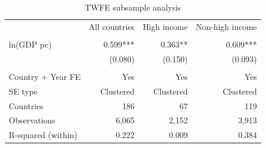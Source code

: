 \begin{table}[h]
\centering
\caption{TWFE subsample analysis}
\begin{tabular}{lrrr}
\toprule
 & All countries & High income & Non-high income \\
 &  &  &  \\
\midrule
ln(GDP pc) & 0.599*** & 0.363** & 0.609*** \\
 & (0.080) & (0.150) & (0.093) \\
 &  &  &  \\
Country + Year FE & Yes & Yes & Yes \\
SE type & Clustered & Clustered & Clustered \\
Countries & 186 & 67 & 119 \\
Observations & 6,065 & 2,152 & 3,913 \\
R-squared (within) & 0.222 & 0.009 & 0.384 \\
\bottomrule
\end{tabular}
\end{table}
